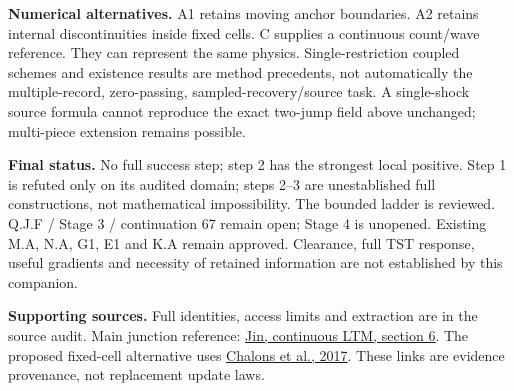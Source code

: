 \documentclass[11pt,a4paper]{article}
\begin{document}
\textbf{Numerical alternatives.} A1 retains moving anchor boundaries. A2
retains internal discontinuities inside fixed cells. C supplies a continuous
count/wave reference. They can represent the same physics. Single-restriction
coupled schemes and existence results are method precedents, not automatically
the multiple-record, zero-passing, sampled-recovery/source task. A single-shock
source formula cannot reproduce the exact two-jump field above unchanged;
multi-piece extension remains possible.

\textbf{Final status.} No full success step; step 2 has the strongest local
positive. Step 1 is refuted only on its audited domain; steps 2--3 are
unestablished full constructions, not mathematical impossibility. The bounded
ladder is reviewed. Q.J.F / Stage 3 / continuation 67 remain open; Stage 4 is
unopened. Existing M.A, N.A, G1, E1 and K.A remain approved. Clearance, full
TST response, useful gradients and necessity of retained information are not
established by this companion.

\textbf{Supporting sources.} Full identities, access limits and extraction
are in the source audit. Main junction reference:
\href{https://arxiv.org/pdf/1405.7080}{Jin, continuous LTM, section 6}.
The proposed fixed-cell alternative uses
\href{https://ems.press/content/serial-article-files/36595}{Chalons et al., 2017}.
These links are evidence provenance, not replacement update laws.
\end{document}
